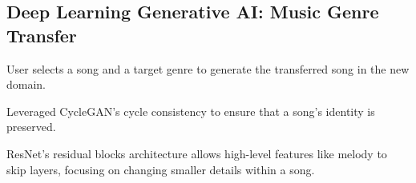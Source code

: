 \subsection{{Deep Learning Generative AI: Music Genre Transfer}}
\begin{zitemize}
\item User selects a song and a target genre to generate the transferred song in the new domain.
\item Leveraged CycleGAN's cycle consistency to ensure that a song's identity is preserved. 
\item ResNet's residual blocks architecture allows high-level features like melody to skip layers, focusing on changing smaller details within a song. 
\end{zitemize}

















